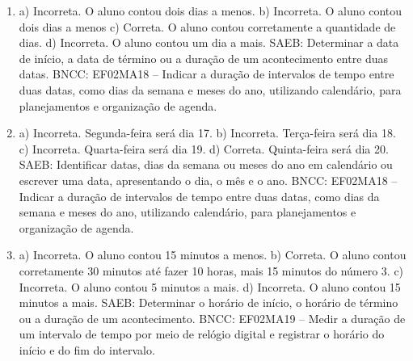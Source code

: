 
\begin{enumerate}
\item
a) Incorreta. O aluno contou dois dias a menos.
b) Incorreta. O aluno contou dois dias a menos
c) Correta. O aluno contou corretamente a quantidade de dias.
d) Incorreta. O aluno contou um dia a mais.
SAEB: Determinar a data de início, a data de término ou a
duração de um acontecimento entre duas datas.
BNCC: EF02MA18 -- Indicar a duração de intervalos de tempo entre duas
datas, como dias da semana e meses do ano, utilizando calendário, para planejamentos e organização
de agenda.

\item
a) Incorreta. Segunda-feira será dia 17.
b) Incorreta. Terça-feira será dia 18.
c) Incorreta. Quarta-feira será dia 19.
d) Correta. Quinta-feira será dia 20.
SAEB: Identificar datas, dias da semana ou meses do ano em calendário ou escrever uma data, apresentando o dia, o mês e o ano.
BNCC: EF02MA18 -- Indicar a duração de intervalos de tempo entre duas datas, como dias da semana e meses do ano, utilizando calendário, para planejamentos e organização de agenda.

\item
a) Incorreta. O aluno contou 15 minutos a menos.
b) Correta. O aluno contou corretamente 30 minutos até fazer 10 horas, mais 15 minutos do número 3.
c) Incorreta. O aluno contou 5 minutos a mais.
d) Incorreta. O aluno contou 15 minutos a mais.
SAEB: Determinar o horário de início, o horário de término ou a
duração de um acontecimento.
BNCC: EF02MA19 -- Medir a duração de um intervalo de tempo por meio de
relógio digital e registrar o horário do início e do fim do intervalo.
\end{enumerate}


